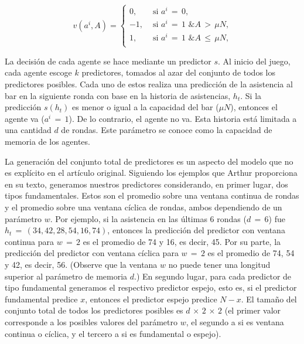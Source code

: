 \documentclass[11pt]{amsart}
\begin{document}
\vspace{-.5\baselineskip}

\[
v(a^i,A) = \begin{cases}
0, & \mbox{ si  $a^i\,{=}\,0$,}\\
-1, & \mbox{ si $a^i\,{=}\,1$ \& $A\,{>}\,\mu N$,}\\
1, & \mbox{ si $a^i\,{=}\,1$ \& $A\,{\leq}\,\mu N$,}\\
\end{cases}
\]

\vspace{.5\baselineskip}

La decisión de cada agente se hace mediante un predictor $s$. Al inicio del juego, cada agente escoge $k$ predictores, tomados al azar del conjunto de todos los predictores posibles. Cada uno de estos realiza una predicción de la asistencia al bar en la siguiente ronda con base en la historia de asistencias, $h_t$. Si la predicción $s(h_t)$ es menor o igual a la capacidad del bar ($\mu N$), entonces el agente va ($a^i\,{=}\,1$). De lo contrario, el agente no va. Esta historia está limitada a una cantidad $d$ de rondas. Este parámetro se conoce como la capacidad de memoria de los agentes. 

La generación del conjunto total de predictores es un aspecto del modelo que no es explícito en el artículo original. Siguiendo los ejemplos que Arthur proporciona en su texto, generamos nuestros predictores considerando, en primer lugar, dos tipos fundamentales. Estos son el promedio sobre una ventana continua de rondas y el promedio sobre una ventana cíclica de rondas, ambos dependiendo de un parámetro $w$. Por ejemplo, si la asistencia en las últimas 6 rondas ($d\,{=}\,6$) fue $h_t\,{=}\,(34, 42, 28, 54, 16, 74)$, entonces la predicción del predictor con ventana continua para $w\,{=}\,2$ es el promedio de 74 y 16, es decir, 45. Por su parte, la predicción del predictor con ventana cíclica para $w\,{=}\,2$ es el promedio de 74, 54 y 42, es decir, 56. (Observe que la ventana $w$ no puede tener una longitud superior al parámetro de memoria $d$.) En segundo lugar, para cada predictor de tipo fundamental generamos el respectivo predictor espejo, esto es, si el predictor fundamental predice $x$, entonces el predictor espejo predice $N{-}x$. El tamaño del conjunto total de todos los predictores posibles es $d\,{\times}\,2\,{\times}\,2$ (el primer valor corresponde a los posibles valores del parámetro $w$, el segundo a si es ventana continua o cíclica, y el tercero a si es fundamental o espejo).
\end{document}
